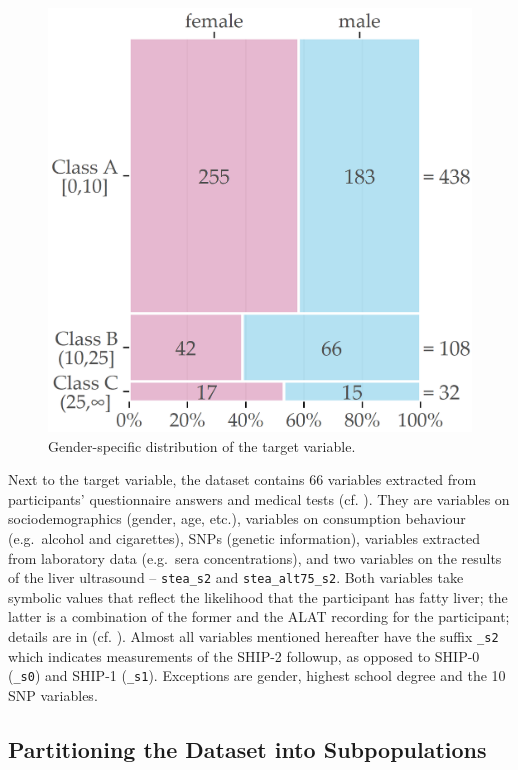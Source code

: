 \documentclass[
  oneside]{book}
\begin{document}
\begin{figure}

{\centering \includegraphics[width=0.5\linewidth]{figures/03-fatty-liver-mosaic} 

}

\caption{Gender-specific distribution of the target variable.}\label{fig:03-fatty-liver-mosaic}
\end{figure}

Next to the target variable, the dataset contains 66 variables extracted from participants' questionnaire answers and medical tests (cf. \autocite{Voelzke:SHIP2011}).
They are variables on sociodemographics (gender, age, etc.),
variables on consumption behaviour (e.g.~alcohol and cigarettes), SNPs (genetic information), variables extracted from laboratory data (e.g.~sera concentrations), and two variables on the results of the liver ultrasound -- \texttt{stea\_s2} and \texttt{stea\_alt75\_s2}.
Both variables take symbolic values that reflect the likelihood that the participant has fatty liver; the latter is a combination of the former and the ALAT recording for the participant; details are in (cf. \autocite{Voelzke:SHIP2011}).
Almost all variables mentioned hereafter have the suffix \texttt{\_s2} which indicates measurements of the SHIP-2 followup, as opposed to SHIP-0 (\texttt{\_s0}) and SHIP-1 (\texttt{\_s1}).
Exceptions are gender, highest school degree and the 10 SNP variables.

\hypertarget{imm-partitioning}{%
\subsection{Partitioning the Dataset into Subpopulations}\label{imm-partitioning}}
\end{document}
